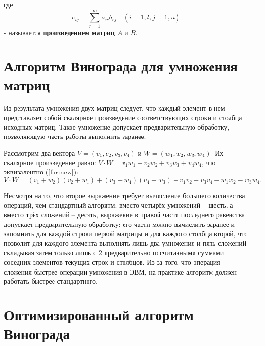 где
\begin{equation}
	\label{eq:M}
	c_{ij} =
	\sum_{r=1}^{m} a_{ir}b_{rj} \quad (i=\overline{1,l}; j=\overline{1,n})
\end{equation}
- называется \textbf{произведением матриц} $A$ и $B$.

\clearpage

\section{Алгоритм Винограда для умножения матриц}
Из результата умножения двух матриц следует, что каждый элемент в нем представляет
собой скалярное произведение соответствующих строки и столбца исходных матриц.
Такое умножение допускает предварительную обработку,
позволяющую часть работы выполнить заранее.

Рассмотрим два вектора $V = (v_1, v_2, v_3, v_4)$ и $W = (w_1, w_2, w_3, w_4)$.
Их скалярное произведение равно: $V \cdot W = v_1w_1 + v_2w_2 + v_3w_3 + v_4w_4$, что эквивалентно (\ref{for:new}):
\begin{equation}
	\label{for:new}
		V \cdot W = (v_1 + w_2)(v_2 + w_1) + (v_3 + w_4)(v_4 + w_3) - v_1v_2 - v_3v_4 - w_1w_2 - w_3w_4.
\end{equation}

Несмотря на то, что второе выражение требует вычисление большего количества операций, чем стандартный алгоритм: вместо четырёх умножений -- шесть, а вместо трёх сложений -- десять, выражение в правой части последнего равенства допускает предварительную обработку: его части можно вычислить заранее и запомнить для каждой строки первой матрицы и для каждого столбца второй, что позволит для каждого элемента выполнять лишь два умножения и пять сложений, складывая затем только лишь с 2 предварительно посчитанными суммами соседних элементов текущих строк и столбцов.
Из-за того, что операция сложения быстрее операции умножения в ЭВМ, на практике алгоритм должен работать быстрее стандартного.\cite{winograd}

\clearpage
\section{Оптимизированный алгоритм Винограда}

